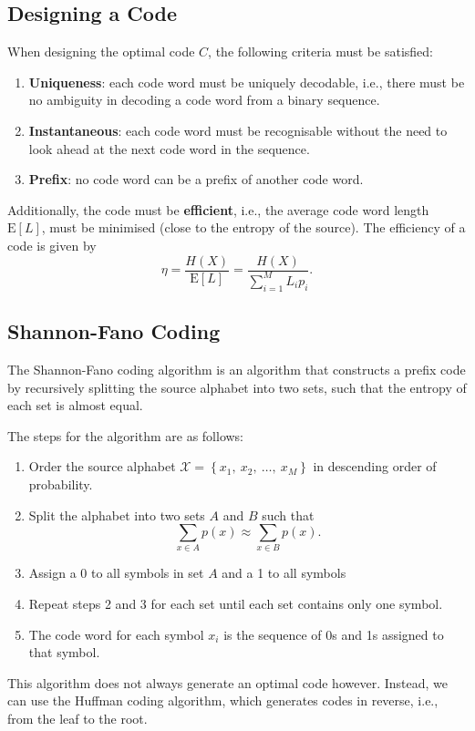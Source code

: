 \documentclass{article}
\begin{document}
\subsection{Designing a Code}
When designing the optimal code \(C\), the following criteria must be
satisfied:
\begin{enumerate}
    \item \textbf{Uniqueness}: each code word must be uniquely
          decodable, i.e., there must be no ambiguity in decoding a
          code word from a binary sequence.
    \item \textbf{Instantaneous}: each code word must be recognisable
          without the need to look ahead at the next code word in the
          sequence.
    \item \textbf{Prefix}: no code word can be a prefix of another code
          word.
\end{enumerate}
Additionally, the code must be \textbf{efficient}, i.e., the average
code word length \(\mathrm{E}\left[ L \right]\), must be minimised
(close to the entropy of the source). The efficiency of a code is given
by
\begin{equation*}
    \eta = \frac{H\left( X \right)}{\mathrm{E}\left[ L \right]} = \frac{H\left( X \right)}{\sum_{i=1}^{M} L_i p_i}.
\end{equation*}
\subsection{Shannon-Fano Coding}
The Shannon-Fano coding algorithm is an algorithm that constructs a
prefix code by recursively splitting the source alphabet into two sets,
such that the entropy of each set is almost equal.

The steps for the algorithm are as follows:
\begin{enumerate}
    \item Order the source alphabet \(\mathcal{X} = \left\{ x_1,\:
          x_2,\: \dots,\: x_M \right\}\) in descending order of
          probability.
    \item Split the alphabet into two sets \(A\) and \(B\) such that
          \begin{equation*}
              \sum_{x \in A} p\left( x \right) \approx \sum_{x \in B} p\left( x \right).
          \end{equation*}
    \item Assign a 0 to all symbols in set \(A\) and a 1 to all symbols
    \item Repeat steps 2 and 3 for each set until each set contains
          only one symbol.
    \item The code word for each symbol \(x_i\) is the sequence of 0s
          and 1s assigned to that symbol.
\end{enumerate}
This algorithm does not always generate an optimal code however. Instead,
we can use the Huffman coding algorithm, which generates codes in reverse,
i.e., from the leaf to the root.
\end{document}
